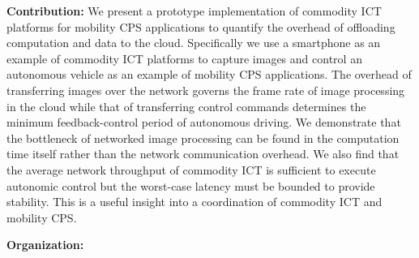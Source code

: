 \textbf{Contribution:}
We present a prototype implementation of commodity ICT platforms for
mobility CPS applications to quantify the overhead of offloading
computation and data to the cloud.
Specifically we use a smartphone as an example of commodity ICT
platforms to capture images and control an autonomous vehicle as an
example of mobility CPS applications.
The overhead of transferring images over the network governs the frame
rate of image processing in the cloud while that of transferring control
commands determines the minimum feedback-control period of autonomous
driving.
We demonstrate that the bottleneck of networked image processing can be
found in the computation time itself rather than the network
communication overhead.
We also find that the average network throughput of commodity ICT is
sufficient to execute autonomic control but the worst-case latency must
be bounded to provide stability.
This is a useful insight into a coordination of commodity ICT and
mobility CPS.

\textbf{Organization:}
